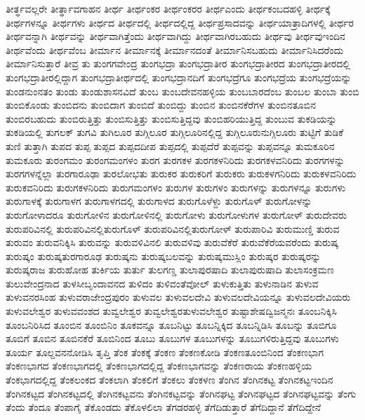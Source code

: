 {ತೀರ್ತ್ಥವಲ್ಲರೇ
ತೀರ್ತ್ಥಾವಗಾಹನ
ತೀರ್ಥ
ತೀರ್ಥಂಕರ
ತೀರ್ಥಂಕರರ
ತೀರ್ಥಎಂದು
ತೀರ್ಥಕಂಬದಹಳ್ಳಿ
ತೀರ್ಥಕ್ಕೆ
ತೀರ್ಥಗಳನ್ನೂ
ತೀರ್ಥಗಳು
ತೀರ್ಥದ
ತೀರ್ಥದಲ್ಲಿ
ತೀರ್ಥದಲ್ಲಿದ್ದ
ತೀರ್ಥಪ್ರಸಾದವನ್ನು
ತೀರ್ಥಯಾತ್ರಾದಿಗಳಲ್ಲಿ
ತೀರ್ಥರ
ತೀರ್ಥವನ್ನಾಗಿ
ತೀರ್ಥವನ್ನು
ತೀರ್ಥವಾಗಿತ್ತೆಂದು
ತೀರ್ಥವಾಗಿದ್ದು
ತೀರ್ಥವಾಗಿರಬಹುದು
ತೀರ್ಥವು
ತೀರ್ಥವುಇಂದಿನ
ತೀರ್ಥವೆಂದು
ತೀರ್ಥವೆಂಬ
ತೀರ್ಮಾನ
ತೀರ್ಮಾನಕ್ಕೆ
ತೀರ್ಮಾನದಂತೆ
ತೀರ್ಮಾನಿಸಬಹುದು
ತೀರ್ಮಾನಿಸಿದರೆಂದು
ತೀರ್ಮಾನಿಸುತ್ತಾರೆ
ತೀವ್ರ
ತು
ತುಂಗಗವೇಂದ್ರ
ತುಂಗಭದ್ರಾ
ತುಂಗಭದ್ರಾತೀರ
ತುಂಗಭದ್ರಾತೀರದ
ತುಂಗಭದ್ರಾತೀರದಲ್ಲಿ
ತುಂಗಭದ್ರಾತೀರಲ್ಲಿದ್ದಾಗ
ತುಂಗಭದ್ರಾತೀರ್ಥದಲ್ಲಿ
ತುಂಗಭದ್ರಾನದಿಗೆ
ತುಂಗಭದ್ರೆಗೂ
ತುಂಗಭದ್ರೆಯ
ತುಂಗಭದ್ರೆಯನ್ನು
ತುಂಡನುಂನತಂ
ತುಂಡು
ತುಂಡುಶಾಸನವಿದೆ
ತುಂಬ
ತುಂಬದೇವನಹಳ್ಳಿಯ
ತುಂಬಬಾರದೆಂಬ
ತುಂಬಲ
ತುಂಬಾ
ತುಂಬಿ
ತುಂಬಿಕೊಂಡು
ತುಂಬಿದನು
ತುಂಬಿದಾಗ
ತುಂಬಿದೆ
ತುಂಬಿದ್ದು
ತುಂಬಿನ
ತುಂಬಿನಕೆರೆಗಳ
ತುಂಬಿನತೂಬಿನ
ತುಂಬಿರಬಹುದು
ತುಂಬಿರುತ್ತಿತ್ತು
ತುಂಬಿಸುತ್ತಿತ್ತು
ತುಂಬಿಸುತ್ತಿದ್ದವು
ತುಂಬಿಹರಿಯುತ್ತಿದ್ದ
ತುಂಬುವ
ತುಕಡಿಯನ್ನು
ತುಕಡಿಯಲ್ಲಿ
ತುಗಲಕ್
ತುಗವಿ
ತುಗಿಲೂರ
ತುಗ್ಗಿಲೂರ
ತುಗ್ಗಿಲೂರಿನಲ್ಲಿದ್ದ
ತುಗ್ಗಿಲೂರುನುಗ್ಗಿಲೂರು
ತುಟ್ಟಿಗೆ
ತುಡಿಕೆ
ತುಣಿ
ತುತ್ತಾಗಿ
ತುಪದ
ತುಪ್ಪ
ತುಪ್ಪದ
ತುಪ್ಪದದೀಪ
ತುಪ್ಪದಲ್ಲಿ
ತುಪ್ಪದೆರೆ
ತುಪ್ಪವನ್ನು
ತುಪ್ಪವನ್ನೂ
ತುಮಕೂರಿನ
ತುಮಕೂರು
ತುರಂಗಮಂ
ತುರಂಗಮಂಗಳಂ
ತುರಗ
ತುರಗಕಳ
ತುರಗಕಳನಿರಿದು
ತುರಗಕಳವನಿರಿದು
ತುರಗಗಳನ್ನು
ತುರಗಗಳನ್ನೆಲ್ಲಾ
ತುರಗಾರೂಢಾ
ತುರಲೋಭತು
ತುರುಕರ
ತುರುಕರಿಗೆ
ತುರುಕರು
ತುರುಕಳಗನಿರಿದು
ತುರುಕಳವನಿರಿದು
ತುರುಕವನಿರಿದು
ತುರುಗಕಳನಿರಿದು
ತುರುಗಮಂಗಳಂ
ತುರುಗಳ
ತುರುಗಳಂ
ತುರುಗಳನ್ನು
ತುರುಗಳನ್ನೂ
ತುರುಗಳು
ತುರುಗಾಳಕ್ಕೆ
ತುರುಗಾಳಗ
ತುರುಗಾಳಗದಲ್ಲಿ
ತುರುಗಾಳದ
ತುರುಗೊಳೆಳ್ದು
ತುರುಗೊಳ್
ತುರುಗೋಳನ್ನು
ತುರುಗೋಳಾದರೂ
ತುರುಗೋಳಿನ
ತುರುಗೋಳಿನಲ್ಲಿ
ತುರುಗೋಳು
ತುರುಗೋಳುಗಳ
ತುರುಗೋಳ್
ತುರುದೇವರು
ತುರುಪರಿವಿನಲ್ಲಿ
ತುರುಪರಿವಿನಲ್ಲಿತುರುಗೊಳ್
ತುರುಪರಿವಿನಲ್ಲಿತುರುಗೋಳ್
ತುರುಪಾರಿವಿ
ತುರುಮುಣ್ಡಿ
ತುರುವ
ತುರುವಂ
ತುರುವನಿಕ್ಕಿಸಿ
ತುರುವನ್ನು
ತುರುವಳಿವಿನಲಿ
ತುರುವಳಿವು
ತುರುವೆಕೆರೆ
ತುರುವೆಕೆರೆಯವರೆಂದು
ತುರುಷ್ಕ
ತುರುಷ್ಕಂ
ತುರುಷ್ಕತುರಗಾರೂಢ
ತುರುಷ್ಕನು
ತುರುಷ್ಕಬಲವನ್ನು
ತುರುಷ್ಕಮುಸ್ಲಿಂ
ತುರುಷ್ಕರ
ತುರುಷ್ಕರನ್ನು
ತುರುಷ್ಕರಾಜ
ತುರುಹೋಹ
ತುರ್ಕಿಯ
ತುರ್ತು
ತುಲಗಣ್ಡ
ತುಲಾಪುರಷಾದಿ
ತುಲಾಪುರುಷಾದಿ
ತುಲಾಸಂಕ್ರಮಣ
ತುಲುವೇಂದ್ರನಾದ
ತುಳಸೀಬೃಂದಾವನದ
ತುಳಿದಂ
ತುಳಿವಂತೆವೋಲ್
ತುಳುಕುತ್ತಿತು
ತುಳುನಾಡಿನ
ತುಳುವ
ತುಳುವನರಸಿಂಹ
ತುಳುವರಾಜೇಂದ್ರಪುರಂ
ತುಳುವಲ
ತುಳುವಲದೇವಿ
ತುಳುವಲದೇವಿಯನ್ನೂ
ತುಳುವಲದೇವಿಯರು
ತುಳುವಲೇಶ್ವರ
ತುಳುವವಂಶದ
ತುವ್ವಲೇಶ್ವರ
ತುವ್ವಲೇಶ್ವರತುಳುವಲೇಶ್ವರ
ತುಷ್ಟಾಶೇಷದ್ವಿಜನ್ಮನಃ
ತೂಂಬನಿಕ್ಕಿಸಿ
ತೂಂಬನಿರಿಸಿದ
ತೂಂಬಿನ
ತೂಂಬಿನಿಂ
ತೂಕವನ್ನೂ
ತೂಬನಿಟ್ಟು
ತೂಬನ್ನಿಕ್ಕಿದ
ತೂಬನ್ನಿಡಿಸಿ
ತೂಬನ್ನು
ತೂಬಿಗೂ
ತೂಬಿಗೆ
ತೂಬಿನ
ತೂಬಿನಕೆರೆ
ತೂಬಿನಿಂದ
ತೂಬು
ತೂಬುಗಳ
ತೂಬುಗಳನ್ನು
ತೂಬುಗಳಿರುತ್ತಿದ್ದವು
ತೂಬುಗಳು
ತೂರ್ಯ
ತೂಲ್ದವನನೋಡಿಸಿ
ತೃಪ್ತಿ
ತೆಂಕ
ತೆಂಕಕ್ಕೆ
ತೆಂಕಣ
ತೆಂಕಣಕೋಡಿ
ತೆಂಕಣತೂಂಬಿನಿಂದ
ತೆಂಕಣಭಾಗ
ತೆಂಕಣಭಾಗದ
ತೆಂಕಣಭಾಗದಲ್ಲಿ
ತೆಂಕಣಭಾಗದಲ್ಲಿದ್ದ
ತೆಂಕಣಭಾಗವನ್ನು
ತೆಂಕಣರಾಯ
ತೆಂಕಣಹಳ್ಳಿಯ
ತೆಂಕಭಾಗದಲ್ಲಿದ್ದ
ತೆಂಕಲಂಕದ
ತೆಂಕಲಾಗಿ
ತೆಂಕಲಿಗೆ
ತೆಂಕಲು
ತೆಂಕಳಣ
ತೆಂಗಿನ
ತೆಂಗಿನಕಟ್ಟ
ತೆಂಗಿನಕಟ್ಟಇಂದಿನ
ತೆಂಗಿನಕಟ್ಟದ
ತೆಂಗಿನಕಟ್ಟದಲ್ಲಿ
ತೆಂಗಿನಕಟ್ಟವನು
ತೆಂಗಿನಕಟ್ಟವನ್ನು
ತೆಂಗಿನಘಟ್ಟ
ತೆಂಗಿನಘಟ್ಟದ
ತೆಂಗಿನಘಟ್ಟವನ್ನು
ತೆಂಗು
ತೆಂದು
ತೆಂದೂ
ತೆಂಪಾಗೈ
ತೆಕೊಂಡದು
ತೆಕೊಳಲಿಲಾ
ತೆಗಡರಹಳ್ಳಿ
ತೆಗೆದಿಡುತ್ತಾರೆ
ತೆಗೆದಿದ್ದಾನೆ
ತೆಗೆದಿದ್ದೇನೆ
}
